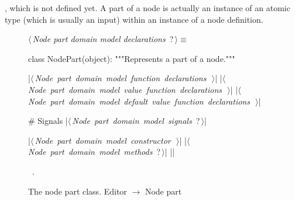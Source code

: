 \documentclass[%
    a4paper,    %
    justified,  %
    nobib,      %
    openany     %
]{tufte-book}
\begin{document}
,
which is not defined yet. A part of a node is actually an instance of an atomic
type (which is usually an input) within an instance of a node definition.

\begin{figure}
\begin{flushleft} \small
\begin{minipage}{\linewidth}\label{scrap115}\raggedright\small
{} $\langle\,${\itshape Node part domain model declarations}\nobreak\ {\footnotesize {?}}$\,\rangle\equiv$
\vspace{-1ex}
\begin{pythoncode}
class NodePart(object):
    """Represents a part of a node."""

    |\hbox{$\langle\,${\itshape Node part domain model function declarations}\nobreak\ {\footnotesize {}}$\,\rangle$}|
    |\hbox{$\langle\,${\itshape Node part domain model value function declarations}\nobreak\ {\footnotesize {}}$\,\rangle$}|
    |\hbox{$\langle\,${\itshape Node part domain model default value function declarations}\nobreak\ {\footnotesize {}}$\,\rangle$}|

    # Signals
    |\hbox{$\langle\,${\itshape Node part domain model signals}\nobreak\ {\footnotesize ?}$\,\rangle$}|

    |\hbox{$\langle\,${\itshape Node part domain model constructor}\nobreak\ {\footnotesize {}}$\,\rangle$}|
    |\hbox{$\langle\,${\itshape Node part domain model methods}\nobreak\ {\footnotesize ?}$\,\rangle$}|
|\NWsep|
\end{pythoncode}
\vspace{1.5ex}
\footnotesize
\begin{list}{}{\setlength{\itemsep}{-\parsep}\setlength{\itemindent}{-\leftmargin}}
\item \NWtxtMacroRefIn\ .

\item{}
\end{list}
\end{minipage}\vspace{4ex}
\end{flushleft}
\caption{The node part class.
  \newline{}\newline{}Editor $\rightarrow$ Node part}
\label{editor:lst:node-part}
\end{figure}
\end{document}

